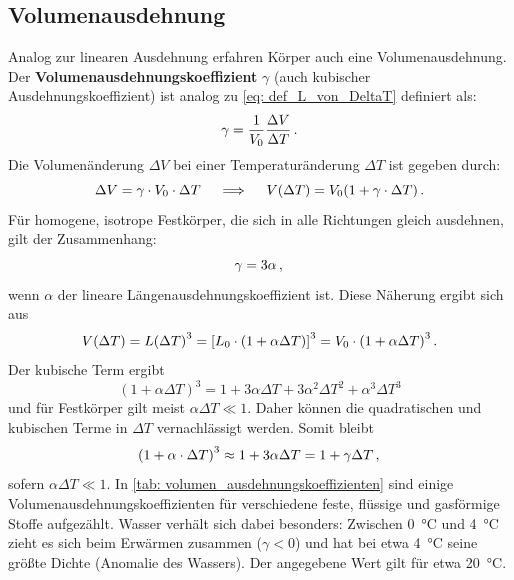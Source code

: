 \subsection{Volumenausdehnung}\label{subsec: volumenausdehnung}
Analog zur linearen Ausdehnung erfahren Körper auch eine Volumenausdehnung. Der \textbf{Volumenausdehnungskoeffizient} $\gamma$ (auch kubischer Ausdehnungskoeffizient) ist analog zu \cref{eq: def_L_von_DeltaT} definiert als:
\begin{equation}
    \gamma = \frac{1}{V_0} \frac{\Delta V}{\Delta T} \,.
\end{equation}
Die Volumenänderung $\Delta V$ bei einer Temperaturänderung $\Delta T$ ist gegeben durch:
\begin{equation}\label{eq: volumenausdehnung}
    \Delta V = \gamma \cdot V_0 \cdot \Delta T \quad \implies \quad V(\Delta T) = V_0 (1 + \gamma \cdot \Delta T) \,.
\end{equation}
Für homogene, isotrope Festkörper, die sich in alle Richtungen gleich ausdehnen, gilt der Zusammenhang:
\begin{equation}
    \gamma = 3\alpha \,{,}\,
\end{equation}
wenn $\alpha$ der lineare Längenausdehnungskoeffizient ist. Diese Näherung ergibt sich aus 
\begin{equation}
    V(\Delta T) = L{(\Delta T)}^3 = {[L_0 \cdot (1+\alpha\Delta T)]}^3 = V_0\cdot{(1+\alpha\Delta T)}^3 \,.
\end{equation} 
Der kubische Term ergibt 
\begin{equation}
    {(1+\alpha \Delta T)}^3 = 1 + 3\alpha \Delta T + 3\alpha^2 \Delta T^2 + \alpha^3 \Delta T^3 
\end{equation}
und für Festkörper gilt meist $\alpha\Delta T \ll 1$. Daher können die quadratischen und kubischen Terme in $\Delta T$ vernachlässigt werden. Somit bleibt 
\begin{equation}
    {(1+\alpha \cdot \Delta T)}^3 \approx 1 + 3\alpha \Delta T = 1 + \gamma \Delta T\,{,}\,
\end{equation}
sofern $\alpha \Delta T \ll 1$. 
In \cref{tab: volumen_ausdehnungskoeffizienten} sind einige Volumenausdehnungskoeffizienten für verschiedene feste, flüssige und gasförmige Stoffe aufgezählt. Wasser verhält sich dabei besonders: Zwischen \SI{0}{\celsius} und \SI{4}{\celsius} zieht es sich beim Erwärmen zusammen ($\gamma < 0$) und hat bei etwa \SI{4}{\celsius} seine größte Dichte (Anomalie des Wassers). Der angegebene Wert gilt für etwa \SI{20}{\celsius}. 
